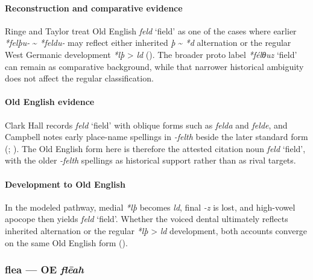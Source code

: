 \documentclass[
  british,
  a4paper,
]{article}
\providecommand{\Recon}[1]{\emph{*#1}}
\begin{document}
\paragraph{Reconstruction and comparative
evidence}\label{reconstruction-and-comparative-evidence-18}

Ringe and Taylor treat Old English {\emph{feld}} `field' as one of the
cases where earlier \emph{*felþu-} \textasciitilde{} \emph{*feldu-} may
reflect either inherited \emph{þ} \textasciitilde{} \emph{*d}
alternation or the regular West Germanic development \emph{*lþ}
\textgreater{} \emph{ld} (). The broader proto label \Recon{félθuz} `field' can
remain as comparative background, while that narrower historical
ambiguity does not affect the regular classification.

\paragraph{Old English evidence}\label{old-english-evidence-18}

Clark Hall records {\emph{feld}} `field' with oblique forms such as
\emph{felda} and \emph{felde}, and Campbell notes early place-name
spellings in \emph{-felth} beside the later standard form
(;
). The Old English form
here is therefore the attested citation noun {\emph{feld}} `field', with
the older \emph{-felth} spellings as historical support rather than as
rival targets.

\paragraph{Development to Old
English}\label{development-to-old-english-18}

In the modeled pathway, medial \emph{*lþ} becomes \emph{ld}, final
\emph{-z} is lost, and high-vowel apocope then yields {\emph{feld}}
`field'. Whether the voiced dental ultimately reflects inherited
alternation or the regular \emph{*lþ} \textgreater{} \emph{ld}
development, both accounts converge on the same Old English form
().

\subsubsection{\texorpdfstring{flea --- OE
\emph{flēah}}{flea --- OE flēah}}\label{flea-oe-flux113ah}
\end{document}
